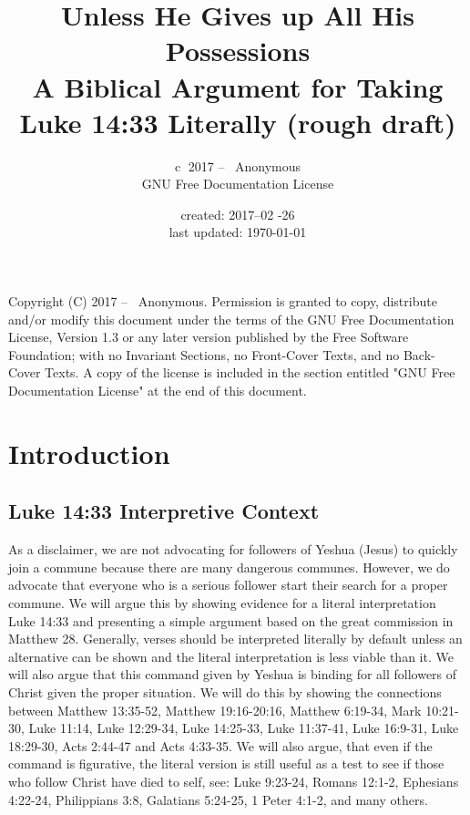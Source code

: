 \documentclass[11pt]{article}
\title{\textbf{Unless He Gives up All His Possessions} \large \\ A Biblical Argument for Taking Luke 14:33 Literally (rough draft) }
\author{\textcircled{c} 2017 -- \the\year \ Anonymous \\ GNU Free Documentation License  }
\date{created: 2017--02 -26 \\ last updated: \today{}}
\begin{document}
\maketitle
\tableofcontents 

\noindent \newline Copyright (C)  2017 -- \the\year \  Anonymous. \newline
Permission is granted to copy, distribute and/or modify this document\newline
under the terms of the GNU Free Documentation License, Version 1.3\newline
or any later version published by the Free Software Foundation;\newline
with no Invariant Sections, no Front-Cover Texts, and no Back-Cover Texts.\newline
A copy of the license is included in the section entitled "GNU\newline
Free Documentation License" at the end of this document.
\section{Introduction}
\subsection{Luke 14:33 Interpretive Context}
As a disclaimer, we are not advocating for followers of Yeshua (Jesus) to quickly join a commune because there are many dangerous communes. However, we do advocate that everyone who is a serious follower start their search for a proper commune. We will argue this by showing evidence for a literal interpretation Luke 14:33 and presenting a simple argument based on the great commission in Matthew 28. Generally, verses should be interpreted literally by default unless an alternative can be shown and the literal interpretation is less viable than it. We will also argue that this command given by Yeshua is binding for all followers of Christ given the proper situation. We will do this by showing the connections between Matthew 13:35-52, Matthew 19:16-20:16, Matthew 6:19-34, Mark 10:21-30, Luke 11:14, Luke 12:29-34, Luke 14:25-33, Luke 11:37-41, Luke 16:9-31, Luke 18:29-30, Acts 2:44-47 and Acts 4:33-35. We will also argue, that even if the command is figurative, the literal version is still useful as a test to see if those who follow Christ have died to self, see: Luke 9:23-24, Romans 12:1-2, Ephesians 4:22-24, Philippians 3:8, Galatians 5:24-25, 1 Peter 4:1-2, and many others.\cite{death to self verses} 
\end{document}
